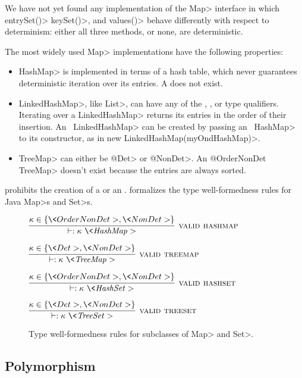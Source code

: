 We have not yet found any implementation of the \<Map>
interface in which \<entrySet()> \<keySet()>, and \<values()> behave
differently with respect to determinism:  either all three methods, or none, are deterministic.

The most widely used \<Map> implementations have the following properties:
\begin{itemize}
    \item \<HashMap> is implemented in terms of a hash table, which never
      guarantees deterministic iteration over its entries. A  does not exist.
    \item \<LinkedHashMap>, like \<List>, can have any of the \aNonDet,
      \aOrderNonDet, or \aDet type qualifiers. Iterating over a
      \<LinkedHashMap> returns
    its entries in the order of their insertion. An \aOrderNonDet\
    \<LinkedHashMap> can be created by passing an
    \aOrderNonDet\ \<HashMap> to its constructor, as in \<new
    LinkedHashMap(myOndHashMap)>.
    \item \<TreeMap> can either be \<@Det> or \<@NonDet>. An \<@OrderNonDet
      TreeMap> doesn't exist because the entries are always sorted.
\end{itemize}

\noindent
\TheDeterminismChecker prohibits the creation of a  or an .
\Cref{fig-creation-rules} formalizes the type well-formedness rules for
Java \<Map>s and \<Set>s.

\begin{figure}
    $\infer[\rulename{valid hashmap}]{\vdash: \|\kappa\ \<HashMap>|}{\kappa \in \{ \<OrderNonDet>, \<NonDet> \}}$
    
    \bigskip
    
    $\infer[\rulename{valid treemap}]{\vdash: \|\kappa\ \<TreeMap>|}{\kappa \in \{ \<Det>, \<NonDet> \}}$
    
    \bigskip
    
    $\infer[\rulename{valid hashset}]{\vdash: \|\kappa\ \<HashSet>|}{\kappa \in \{ \<OrderNonDet>, \<NonDet> \}}$
    
    \bigskip
    
    $\infer[\rulename{valid treeset}]{\vdash: \|\kappa\ \<TreeSet>|}{\kappa \in \{ \<Det>, \<NonDet> \}}$
    \caption{Type well-formedness rules for subclasses of \<Map> and \<Set>.}
    \label{fig-creation-rules}
\end{figure}


\subsection{Polymorphism}\label{java-polymorphism}

